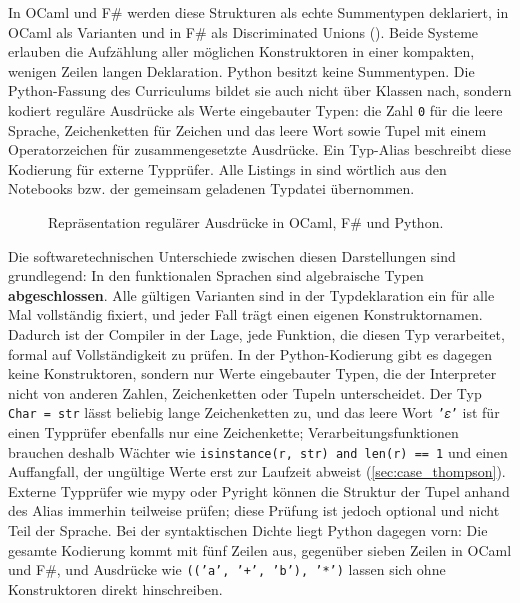 In OCaml und F\# werden diese Strukturen als echte Summentypen deklariert, in OCaml als Varianten und in F\# als Discriminated Unions ().
Beide Systeme erlauben die Aufzählung aller möglichen Konstruktoren in einer kompakten, wenigen Zeilen langen Deklaration.
Python besitzt keine Summentypen.
Die Python-Fassung des Curriculums bildet sie auch nicht über Klassen nach, sondern kodiert reguläre Ausdrücke als Werte eingebauter Typen: die Zahl \texttt{0} für die leere Sprache, Zeichenketten für Zeichen und das leere Wort sowie Tupel mit einem Operatorzeichen für zusammengesetzte Ausdrücke.
Ein Typ-Alias beschreibt diese Kodierung für externe Typprüfer.
Alle Listings in  sind wörtlich aus den Notebooks bzw. der gemeinsam geladenen Typdatei übernommen.

\begin{figure}[htbp]



\caption{Repräsentation regulärer Ausdrücke in OCaml, F\# und Python.}
\label{fig:adt_definitions}
\end{figure}

Die softwaretechnischen Unterschiede zwischen diesen Darstellungen sind grundlegend:
In den funktionalen Sprachen sind algebraische Typen \textbf{abgeschlossen}.
Alle gültigen Varianten sind in der Typdeklaration ein für alle Mal vollständig fixiert, und jeder Fall trägt einen eigenen Konstruktornamen.
Dadurch ist der Compiler in der Lage, jede Funktion, die diesen Typ verarbeitet, formal auf Vollständigkeit zu prüfen.
In der Python-Kodierung gibt es dagegen keine Konstruktoren, sondern nur Werte eingebauter Typen, die der Interpreter nicht von anderen Zahlen, Zeichenketten oder Tupeln unterscheidet.
Der Typ \texttt{Char = str} lässt beliebig lange Zeichenketten zu, und das leere Wort \texttt{'𝜀'} ist für einen Typprüfer ebenfalls nur eine Zeichenkette; Verarbeitungsfunktionen brauchen deshalb Wächter wie \texttt{isinstance(r, str) and len(r) == 1} und einen Auffangfall, der ungültige Werte erst zur Laufzeit abweist (\cref{sec:case_thompson}).
Externe Typprüfer wie mypy oder Pyright können die Struktur der Tupel anhand des Alias immerhin teilweise prüfen; diese Prüfung ist jedoch optional und nicht Teil der Sprache.
Bei der syntaktischen Dichte liegt Python dagegen vorn: Die gesamte Kodierung kommt mit fünf Zeilen aus, gegenüber sieben Zeilen in OCaml und F\#, und Ausdrücke wie \texttt{(('a', '+', 'b'), '*')} lassen sich ohne Konstruktoren direkt hinschreiben.

